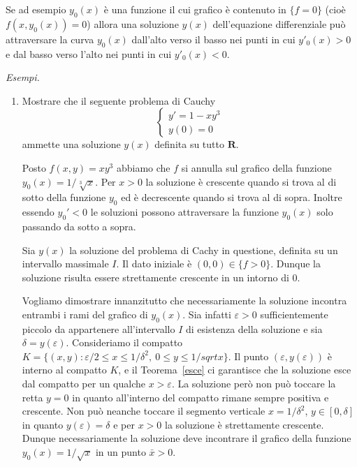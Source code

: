\documentclass[italian,a4paper]{article}
\newcommand{\R}{\mathbf{R}}
\renewcommand{\epsilon}{\varepsilon}
\newtheorem{theorem}{Teorema}[section]
\begin{document}
Se ad esempio $y_0(x)$ \`e una funzione 
il cui grafico \`e contenuto in $\{f=0\}$
(cio\`e $f(x,y_0(x))=0$) allora una soluzione $y(x)$ dell'equazione
differenziale pu\`o attraversare la curva $y_0(x)$ dall'alto verso il
basso nei punti in cui $y'_0(x)>0$ e dal basso verso l'alto nei punti
in cui $y'_0(x)<0$.





\medskip\noindent
\emph{Esempi.}

\begin{enumerate}
\item
Mostrare che il seguente problema di Cauchy
\[
\left\{\begin{array}{l}
  y'=1-x y^3\\
  y(0)=0
	\end{array}\right.
\]
ammette una soluzione $y(x)$ definita su tutto $\R$.


Posto $f(x,y)=xy^3$ abbiamo che $f$ si annulla sul grafico della
funzione $y_0(x)=1/\sqrt[3] x$. Per $x>0$ la soluzione \`e crescente
quando si trova al di sotto della funzione $y_0$ ed \`e decrescente
quando si trova al di sopra. Inoltre essendo $y_0'<0$ le soluzioni possono
attraversare la funzione $y_0(x)$ solo passando da sotto a
sopra. 

Sia $y(x)$ la soluzione del problema di Cachy in questione, definita su
un intervallo massimale $I$. Il dato
iniziale \`e $(0,0)\in \{f>0\}$. Dunque la soluzione risulta essere
strettamente crescente in un intorno di $0$. 

Vogliamo dimostrare innanzitutto che necessariamente la soluzione 
incontra entrambi i rami del grafico di $y_0(x)$. Sia infatti
$\epsilon>0$ sufficientemente piccolo da appartenere all'intervallo
$I$ di
esistenza della soluzione e sia $\delta=y(\epsilon)$. 
Consideriamo il compatto $K=\{(x,y):
\epsilon/2 \le x \le 1/\delta^2,\ 0\le y\le 1/sqrt{x}\}$. Il punto
$(\epsilon,y(\epsilon))$ \`e interno al compatto $K$, e il
Teorema~\ref{esce} ci garantisce che la soluzione esce dal compatto
per un qualche $x>\epsilon$. La soluzione per\`o non pu\`o toccare la
retta $y=0$ in quanto all'interno del compatto rimane sempre positiva
e crescente. Non pu\`o neanche toccare il segmento verticale
$x=1/\delta^2$, $y\in[0,\delta]$ in quanto $y(\epsilon)=\delta$ e per
$x>0$ la soluzione \`e strettamente crescente. Dunque necessariamente
la soluzione deve incontrare il grafico della funzione
$y_0(x)=1/\sqrt{x}$ in un punto $\bar x>0$.


\end{enumerate}
\end{document}
